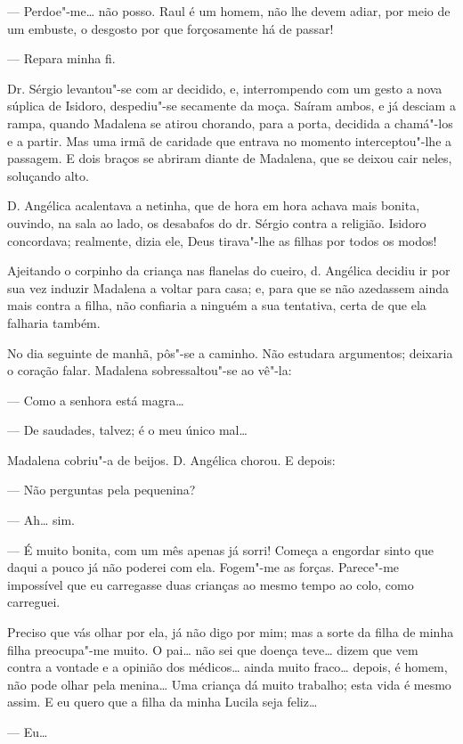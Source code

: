 --- Perdoe"-me\ldots{} não posso. Raul é um homem, não lhe devem adiar, por
meio de um embuste, o desgosto por que forçosamente há de passar!

--- Repara minha fi.

Dr. Sérgio levantou"-se com ar decidido, e, interrompendo com um gesto a
nova súplica de Isidoro, despediu"-se secamente da moça. Saíram ambos, e
já desciam a rampa, quando Madalena se atirou chorando, para a porta,
decidida a chamá"-los e a partir. Mas uma irmã de caridade que entrava no
momento interceptou"-lhe a passagem. E dois braços se abriram diante de
Madalena, que se deixou cair neles, soluçando alto.

D. Angélica acalentava a netinha, que de hora em hora achava mais
bonita, ouvindo, na sala ao lado, os desabafos do dr. Sérgio contra a
religião. Isidoro concordava; realmente, dizia ele, Deus tirava"-lhe as
filhas por todos os modos!

Ajeitando o corpinho da criança nas flanelas do cueiro, d. Angélica
decidiu ir por sua vez induzir Madalena a voltar para casa; e, para que
se não azedassem ainda mais contra a filha, não confiaria a ninguém a
sua tentativa, certa de que ela falharia também.

No dia seguinte de manhã, pôs"-se a caminho. Não estudara argumentos;
deixaria o coração falar. Madalena sobressaltou"-se ao vê"-la:

--- Como a senhora está magra\ldots{}

--- De saudades, talvez; é o meu único mal\ldots{}

Madalena cobriu"-a de beijos. D. Angélica chorou. E depois:

--- Não perguntas pela pequenina?

--- Ah\ldots{} sim.

--- É muito bonita, com um mês apenas já sorri! Começa a engordar sinto
que daqui a pouco já não poderei com ela. Fogem"-me as forças. Parece"-me
impossível que eu carregasse duas crianças ao mesmo tempo ao colo, como
carreguei.

Preciso que vás olhar por ela, já não digo por mim; mas a sorte da filha
de minha filha preocupa"-me muito. O pai\ldots{} não sei que doença teve\ldots{}
dizem que vem contra a vontade e a opinião dos médicos\ldots{} ainda muito
fraco\ldots{} depois, é homem, não pode olhar pela menina\ldots{} Uma criança dá
muito trabalho; esta vida é mesmo assim. E eu quero que a filha da minha
Lucila seja feliz\ldots{}

--- Eu\ldots{}

